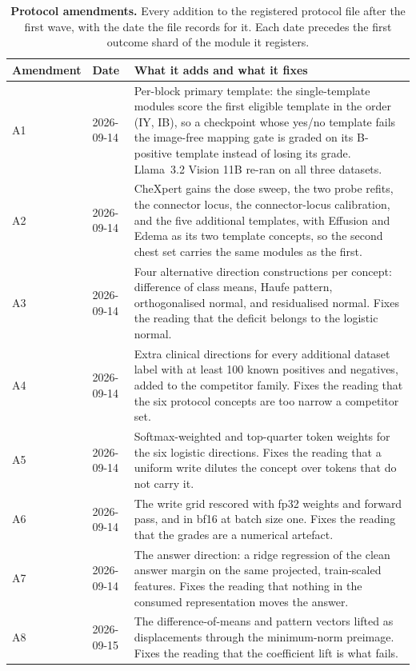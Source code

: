 \documentclass{article}
\begin{document}
\begin{table}[h]
\centering
\scriptsize
\setlength{\tabcolsep}{5pt}
\caption{\textbf{Protocol amendments.} Every addition to the registered protocol file after the first wave, with the date the file records for it. Each date precedes the first outcome shard of the module it registers.}
\label{tab:cf-amendments}
\begin{tabular}{ll>{\raggedright\arraybackslash}p{}}
\toprule
Amendment & Date & What it adds and what it fixes \\
\midrule
A1 & 2026-09-14 & Per-block primary template: the single-template modules score the first eligible template in the order (IY, IB), so a checkpoint whose yes/no template fails the image-free mapping gate is graded on its B-positive template instead of losing its grade. Llama~3.2 Vision 11B re-ran on all three datasets. \\
A2 & 2026-09-14 & CheXpert gains the dose sweep, the two probe refits, the connector locus, the connector-locus calibration, and the five additional templates, with Effusion and Edema as its two template concepts, so the second chest set carries the same modules as the first. \\
A3 & 2026-09-14 & Four alternative direction constructions per concept: difference of class means, Haufe pattern, orthogonalised normal, and residualised normal. Fixes the reading that the deficit belongs to the logistic normal. \\
A4 & 2026-09-14 & Extra clinical directions for every additional dataset label with at least 100 known positives and negatives, added to the competitor family. Fixes the reading that the six protocol concepts are too narrow a competitor set. \\
A5 & 2026-09-14 & Softmax-weighted and top-quarter token weights for the six logistic directions. Fixes the reading that a uniform write dilutes the concept over tokens that do not carry it. \\
A6 & 2026-09-14 & The write grid rescored with fp32 weights and forward pass, and in bf16 at batch size one. Fixes the reading that the grades are a numerical artefact. \\
A7 & 2026-09-14 & The answer direction: a ridge regression of the clean answer margin on the same projected, train-scaled features. Fixes the reading that nothing in the consumed representation moves the answer. \\
A8 & 2026-09-15 & The difference-of-means and pattern vectors lifted as displacements through the minimum-norm preimage. Fixes the reading that the coefficient lift is what fails. \\

\end{tabular}
\end{table}
\end{document}
